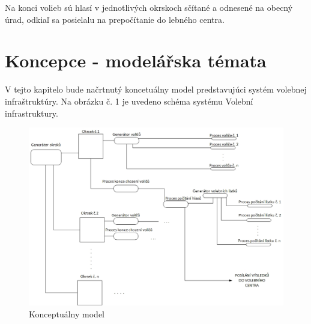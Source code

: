 \documentclass[12pt,a4paper,titlepage,final]{article}
\begin{document}
Na konci volieb sú hlasí v jednotlivých okrskoch sčítané a odnesené na obecný úrad, odkiaľ sa posielalu na prepočítanie do lebného centra.

  







\section{Koncepce - modelářska témata}
V tejto kapitelo bude načrtnutý koncetuálny model predstavujúci systém volebnej infraštruktúry.
Na obrázku č. 1 je uvedeno schéma systému Volební infrastruktury. 
\begin{figure}[h]

\begin{center}

\includegraphics[scale=0.7]{img/konceptualni_model.eps} 
\caption{Konceptuálny model}
\label{koncept}

\end{center}

\end{figure}
\newpage
\end{document}

